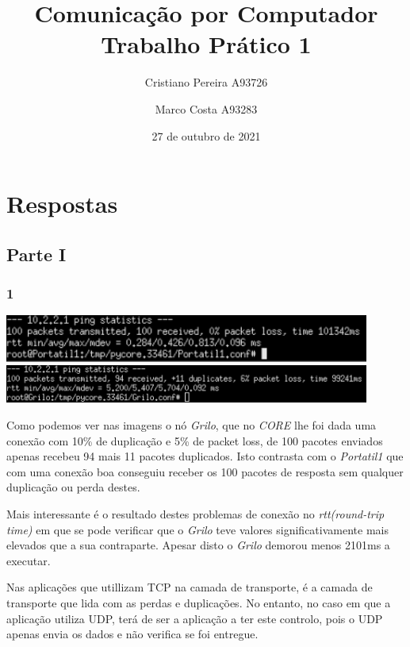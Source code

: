 \documentclass{article}
\title{
    Comunicação por Computador \\
    \large{Trabalho Prático 1}
}
\author{
    Cristiano Pereira A93726
}
\author{
    Marco Costa A93283
}
\date{27 de outubro de 2021}
\affil{
    Universidade do Minho
}
\begin{document}
        \maketitle
    \section*{Respostas}
        \subsection*{Parte I}
            \subsubsection*{1}
                {
                    \centering
                    \includegraphics[width=12cm]{images/ping-portatil.png}
                    \includegraphics[width=12cm]{images/ping-grilo.png}
                    \par
                }
                    Como podemos ver nas imagens o nó \textit{Grilo}, que no \textit{CORE} lhe foi dada
                uma conexão com 10\% de duplicação e 5\% de packet loss, de 100 pacotes enviados apenas recebeu
                94 mais 11 pacotes duplicados. Isto contrasta com o \textit{Portatil1} que com uma conexão boa conseguiu
                receber os 100 pacotes de resposta sem qualquer duplicação ou perda destes.\par

                    Mais interessante é o resultado destes problemas de conexão no \textit{rtt(round-trip time)} em que se pode verificar
                que o \textit{Grilo} teve valores significativamente mais elevados que a sua contraparte. Apesar disto o \textit{Grilo} demorou
                menos 2101ms a executar.

		Nas aplicações que utillizam TCP na camada de transporte, é a camada de transporte que lida com as perdas e duplicações. No entanto, no caso em que a aplicação utiliza UDP, terá de ser a aplicação a ter este controlo, pois o UDP apenas envia os dados e não verifica se foi entregue.
\end{document}
